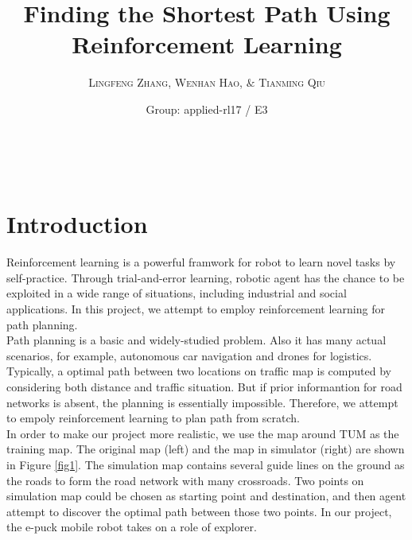 \documentclass[a4paper, 11pt]{article} %
\title{\textbf{Finding the Shortest Path Using Reinforcement Learning}} %
\author{\textsc{Lingfeng Zhang, Wenhan Hao, $\&$ Tianming Qiu} %
\\{\textit{}}} %
\date{Group: applied-rl17 / E3} %
\makeatletter
\renewcommand{\maketitle}{ %
\begin{flushright} %
{\LARGE\@title} %

\vspace{50pt} %

{\large\@author} %
\\\@date %

\vspace{40pt} %
\end{flushright}
}
\makeatother
\begin{document}
\maketitle %



\section{Introduction}
Reinforcement learning is a powerful framwork for robot to learn novel tasks by
self-practice. Through trial-and-error learning, robotic agent has the chance to
be exploited in a wide range of situations, including industrial and social
applications. In this project, we attempt to employ reinforcement learning for
path planning.
\\[3ex]
Path planning is a basic and widely-studied problem. Also it has many actual
scenarios, for example, autonomous car navigation and drones for logistics.
Typically, a optimal path between two locations on traffic map is computed by
considering both distance and traffic situation. But if prior informantion for
road networks is absent, the planning is essentially impossible. Therefore,
we attempt to empoly reinforcement learning to plan path from scratch.
\\[3ex]
In order to make our project more realistic, we use the map around TUM as the
training map. 
The original map (left) and the map in simulator (right) are shown
in Figure \ref{fig1}. The simulation map contains several guide lines on the
ground as the roads to form the road network with many crossroads. Two points on
simulation map could be chosen as starting point and destination, and then agent
attempt to discover the optimal path between those two points. In our project,
the e-puck mobile robot takes on a role of explorer.
\end{document}
